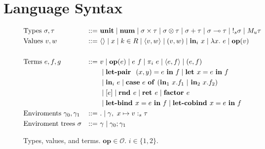 \section{Language Syntax}

\begin{figure}[tbp]
  \begin{alignat*}{3}
         &\text{Types } \sigma, \tau &::=~ &\mathbf{unit}
         \mid \textbf{num}
         \mid \sigma \times \tau 
         \mid \sigma \otimes \tau
         \mid \sigma + \tau 
         \mid \sigma \multimap \tau
         \mid {{!_{s}} \sigma}
         \mid {M_u \tau}
         \\
         &\text{Values } v, w \ &::=~ &\langle \rangle
         \mid x
         \mid k \in R
         \mid \langle v,w \rangle 
         \mid (v, w)
         \mid \textbf{in}_i \ x
         \mid \lambda x.~e
         \mid \mathbf{op}(v) \\
         \\
         &\text{Terms } e, f, g &::=~ &v
         \mid \mathbf{op}(e)
         \mid e~f
         \mid {\pi}_i\ e
         \mid \langle e,f \rangle 
         \mid (e, f) \\
         & & & \mid \textbf{let-pair } \ (x,y) = e \ \textbf{in} \ f
         \mid \textbf{let } x  = e \ \textbf{in} \ f \\
         & & & \mid \textbf{in}_i \ e
         \mid 
          \mathbf{case} \ e \ \mathbf{of} \ (\textbf{in}_1 \ x.f_1 \ | \ \textbf{in}_2 \ x.f_2) \\
         & & &
         \mid [e]
         \mid \textbf{rnd } e
         \mid {\textbf{ret }e} 
         \mid \textbf{factor } e \\
         & & & 
         \mid {\textbf{let-bind }x = e \ \textbf{in}\ f}
         \mid \textbf{let-cobind } x = e \ \textbf{in} \ f
         \\
         &\text{Enviroments } \gamma_0, \gamma_1 &::=~ &.
         \mid \gamma, \ x \mapsto v :_s \tau \\
         &\text{Enviroment trees } \sigma &::=~ & \gamma
         \mid \gamma_0; \gamma_1
  \end{alignat*}
  \caption{
    Types, values, and terms. 
    $\mathbf{op} \in \mathcal{O}$.
    $i \in \{1, 2\}$. 
  }
  \label{fig:syntax}
\end{figure}


